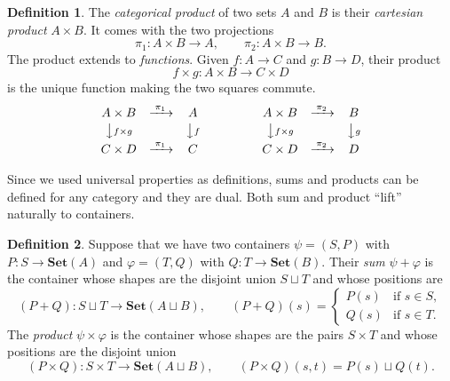 \documentclass[11pt, a4paper]{article}
\theoremstyle{definition}
\newtheorem{definition}{Definition}[section]
\theoremstyle{plain}
\begin{document}
\medskip

\noindent\colorbox{gray!15}{\parbox{\dimexpr\linewidth-2\fboxsep}{%
\begin{definition}\label{def:product-functions}
The \emph{categorical product} of two sets $A$ and $B$ is
their \emph{cartesian product} $A \times B$.  It comes
with the two projections
\[
  \pi_1 : A \times B \to A,
  \qquad
  \pi_2 : A \times B \to B.
\]
The product extends to \emph{functions}.  Given $f : A \to C$ and
$g : B \to D$, their product
\[
  f \times g : A \times B \to C \times D
\]
is
the unique function making the two squares commute.
\[
\begin{array}{ccc}
  A \times B & \xrightarrow{\;\pi_1\;} & A\\[2pt]
  \big\downarrow{\scriptstyle f \times g} & & \big\downarrow{\scriptstyle f}\\[2pt]
  C \times D & \xrightarrow{\;\pi_1\;} & C
\end{array}
\qquad\qquad
\begin{array}{ccc}
  A \times B & \xrightarrow{\;\pi_2\;} & B\\[2pt]
  \big\downarrow{\scriptstyle f \times g} & & \big\downarrow{\scriptstyle g}\\[2pt]
  C \times D & \xrightarrow{\;\pi_2\;} & D
\end{array}
\]
\end{definition}%
}}

\medskip
\noindent
Since we used universal properties as definitions, sums and products
can be defined for any category and they are dual.  Both sum and
product ``lift'' naturally to containers.

\medskip
\noindent\colorbox{gray!15}{\parbox{\dimexpr\linewidth-2\fboxsep}{%
\begin{definition}\label{def:sum}
Suppose that we have two containers $\psi = (S, P)$ with
$P : S \to \mathbf{Set}(A)$ and $\varphi = (T, Q)$ with
$Q : T \to \mathbf{Set}(B)$.  Their \emph{sum}
$\psi + \varphi$ is the container whose shapes are the disjoint union
$S \sqcup T$ and whose positions are
\[
  (P + Q) : S \sqcup T \to \mathbf{Set}(A \sqcup B), \qquad
  (P + Q)(s) =
  \begin{cases}
    P(s) & \text{if } s \in S,\\
    Q(s) & \text{if } s \in T.
  \end{cases}
\]
The \emph{product} $\psi \times \varphi$ is the container whose
shapes are the pairs $S \times T$ and whose positions are the
disjoint union
\[
  (P \times Q) : S \times T \to \mathbf{Set}(A \sqcup B),
  \qquad
  (P \times Q)(s, t) = P(s) \sqcup Q(t).
\]
\end{definition}%
}}
\end{document}
